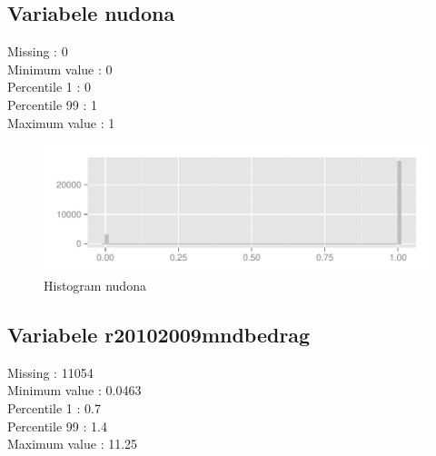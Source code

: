 \documentclass[10pt,a4paper,titlepage]{report}
\begin{document}

\subsection{Variabele nudona}

Missing :  0 \\
Minimum value : 0\\
Percentile 1 : 0\\
Percentile 99 : 1\\
Maximum value : 1

\color{red}


\color{black}

\begin{figure}[H]
   \centering
\begin{knitrout}
\color{fgcolor}\begin{kframe}


{\ttfamily\noindent\color{warningcolor}{\#\# Warning: position\_stack requires constant width: output may be incorrect}}\end{kframe}
\includegraphics[width=\maxwidth]{figure/unnamed-chunk-8} 

\end{knitrout}

    \caption{Histogram nudona}
    \label{fig:figPlot4}
\end{figure}


\subsection{Variabele r20102009mndbedrag}

Missing :  11054 \\
Minimum value : 0.0463\\
Percentile 1 : 0.7\\
Percentile 99 : 1.4\\
Maximum value : 11.25
\end{document}
